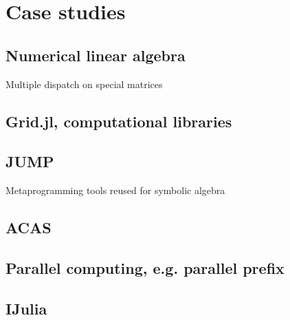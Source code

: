 \chapter{Case studies}


\section{Numerical linear algebra}

Multiple dispatch on special matrices


\section{Grid.jl, computational libraries}


\section{JUMP}

Metaprogramming tools reused for symbolic algebra


\section{ACAS}


\section{Parallel computing, e.g. parallel prefix}


\section{IJulia}
